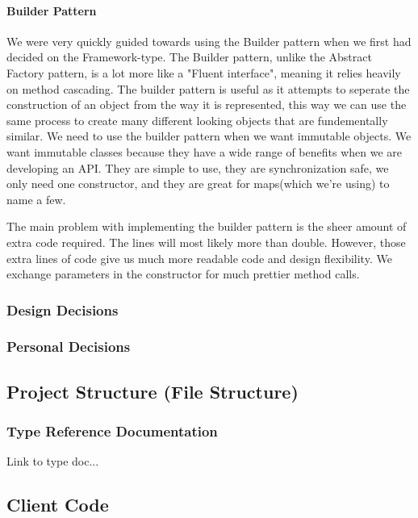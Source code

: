 \documentclass[12pt]{article}
\begin{document}
    \paragraph{Builder Pattern}
    We were very quickly guided towards using the Builder pattern when we first had decided on the Framework-type. The Builder pattern, unlike the Abstract Factory pattern, is a lot more like a "Fluent interface", meaning it relies heavily on method cascading.
    The builder pattern is useful as it attempts to seperate the construction of an object from the way it is represented, this way we can use the same process to create many different looking objects that are fundementally similar.
    We need to use the builder pattern when we want immutable objects. We want immutable classes because they have a wide range of benefits when we are developing an API. They are simple to use, they are synchronization safe, we only need one constructor, and they are great for maps(which we're using) to name a few.

    The main problem with implementing the builder pattern is the sheer amount of extra code required. The lines will most likely more than double. However, those extra lines of code give us much more readable code and design flexibility. We exchange parameters in the constructor for much prettier method calls.


    \subsubsection{Design Decisions}

    \subsubsection{Personal Decisions}

\subsection{Project Structure (File Structure)}

    \subsubsection{Type Reference Documentation}
    Link to type doc...

\subsection{Client Code}
\end{document}
